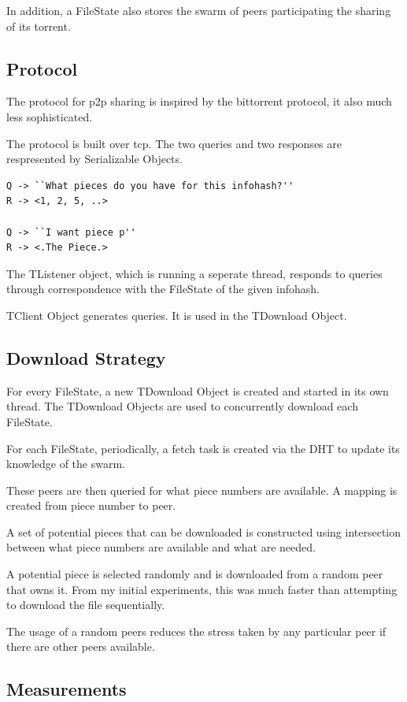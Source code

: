\documentclass{article}
\begin{document}
In addition, a FileState also stores the swarm of peers participating the sharing of its torrent.

\subsection{Protocol}

The protocol for p2p sharing is inspired by the bittorrent protocol, it also much less sophisticated.

The protocol is built over tcp. The two queries and two responses are respresented by Serializable Objects.

\begin{verbatim}
Q -> ``What pieces do you have for this infohash?''
R -> <1, 2, 5, ..>

Q -> ``I want piece p''
R -> <.The Piece.>
\end{verbatim}

The TListener object, which is running a seperate thread, responds to queries through correspondence with the FileState of the given infohash.

TClient Object generates queries. It is used in the TDownload Object.

\subsection{Download Strategy}

For every FileState, a new TDownload Object is created and started in its own thread. The TDownload Objects are used to concurrently download each FileState.

For each FileState, periodically, a fetch task is created via the DHT to update its knowledge of the swarm.

These peers are then queried for what piece numbers are available. A mapping is created from piece number to peer.

A set of potential pieces that can be downloaded is constructed using intersection between what piece numbers are available and what are needed.

A potential piece is selected randomly and is downloaded from a random peer that owns it. From my initial experiments, this was much faster than attempting to download the file sequentially.

The usage of a random peers reduces the stress taken by any particular peer if there are other peers available.

\subsection{Measurements}
\end{document}
